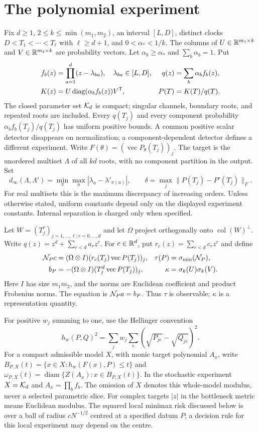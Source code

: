\section{The polynomial experiment}
\label{sec:model-v94}
Fix $d\ge1$, $2\le k\le\min(m_1,m_2)$, an interval $[L,D]$,
distinct clocks $D<T_1<\cdots<T_\ell$ with $\ell\ge d+1$,
and $0<\alpha_*<1/k$. The columns of
$U\in\mathbb R^{m_1\times k}$ and $V\in\mathbb R^{m_2\times k}$ are probability
vectors. Let $\alpha_b\ge\alpha_*$ and $\sum_b\alpha_b=1$. Put
\begin{align}
 f_b(z)&=\prod_{a=1}^d(z-\lambda_{ba}),\quad \lambda_{ba}\in[L,D],
 &q(z)&=\sum_b\alpha_b f_b(z),\nonumber\\
 K(z)&=U\operatorname{diag}(\alpha_b f_b(z))V^{\mathsf T},
 &P(T)&=K(T)/q(T).\label{eq:model}
\end{align}
The closed parameter set $\mathcal K_d$ is compact; singular channels,
boundary roots, and repeated roots are included. Every $q(T_j)$
and every component probability $\alpha_bf_b(T_j)/q(T_j)$ has
uniform positive bounds. A common positive scalar detector disappears
on normalization; a component-dependent detector defines a different
experiment. Write $F(\theta)=(\operatorname{vec}P_\theta(T_j))_j$.
The target is the unordered multiset $\Lambda$ of all $kd$ roots,
with no component partition in the output. Set
\[
 d_\infty(\Lambda,\Lambda')=\min_\pi\max_a
          |\lambda_a-\lambda'_{\pi(a)}|,
 \qquad \delta=\max_j\|P(T_j)-P'(T_j)\|_F.
\]
For real multisets this is the maximum discrepancy of increasing
orders. Unless otherwise stated, uniform constants depend only on
the displayed experiment constants. Internal separation is charged
only when specified.

Let $W=(T_j^r)_{j=1,\ldots,\ell;r=0,\ldots,d}$ and let $\Omega$
project orthogonally onto $\operatorname{col}(W)^\perp$.
Write $q(z)=z^d+\sum_{r<d}a_rz^r$. For $c\in\mathbb R^d$, put
$r_c(z)=\sum_{r<d}c_rz^r$ and define
\begin{align}
 \mathcal N_Pc&=(\Omega\otimes I)
              (r_c(T_j)\operatorname{vec}P(T_j))_j,
 &\tau(P)&=\sigma_{\min}(\mathcal N_P),\nonumber\\
 b_P&=-(\Omega\otimes I)
              (T_j^d\operatorname{vec}P(T_j))_j,
 &\kappa&=\sigma_k(U)\sigma_k(V).\label{eq:normalization}
\end{align}
Here $I$ has size $m_1m_2$, and the norms are Euclidean coefficient
and product Frobenius norms. The equation is $\mathcal N_Pa=b_P$.
Thus $\tau$ is observable; $\kappa$ is a representation quantity.

For positive $w_j$ summing to one, use the Hellinger convention
\[
 h_w(P,Q)^2=\sum_jw_j\sum_e(\sqrt{P_{je}}-\sqrt{Q_{je}})^2.
\]
For a compact admissible model $X$, with monic target polynomial $A_x$,
write $B_{P,X}(t)=\{x\in X:h_w(F(x),P)\le t\}$ and
$\omega_{P,X}(t)=\operatorname{diam}\{Z(A_x):x\in B_{P,X}(t)\}$.
In the stochastic experiment $X=\mathcal K_d$ and $A_x=\prod_bf_b$.
The omission of $X$ denotes this whole-model modulus, never a selected
parametric slice. For complex targets $|z|$ in the bottleneck metric
means Euclidean modulus. The squared local minimax risk discussed below
is over a ball of radius $cN^{-1/2}$ centred at a specified datum $P$;
a decision rule for this local experiment may depend on the centre.
